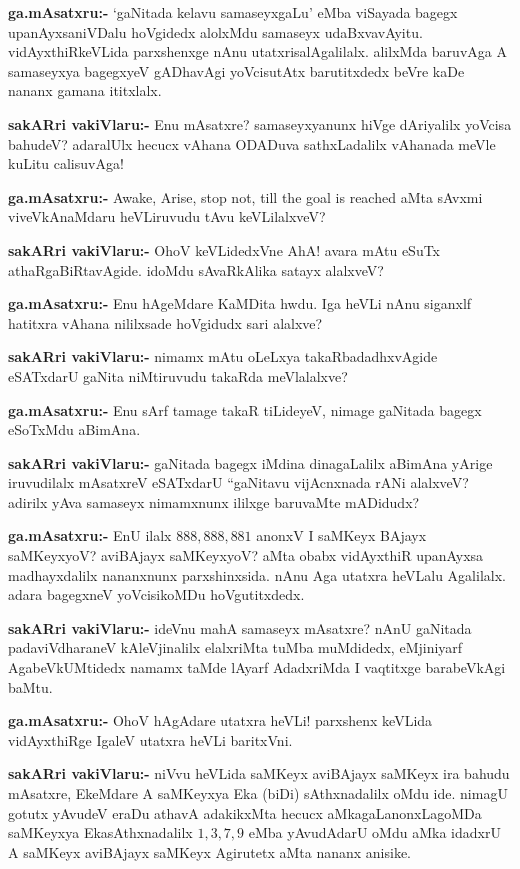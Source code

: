 \smallskip
\noindent
\textbf{ga.mAsatxru:-} `gaNitada kelavu samaseyxgaLu' eMba viSayada bagegx upanAyxsaniVDalu hoVgidedx alolxMdu samaseyx udaBxvavAyitu. vidAyxthiRkeVLida parxshenxge nAnu utatxrisalAgalilalx. alilxMda baruvAga A samaseyxya bagegxyeV gADhavAgi yoVcisutAtx barutitxdedx beVre kaDe nananx gamana ititxlalx.

\smallskip
\noindent
\textbf{sakARri vakiVlaru:-} Enu mAsatxre? samaseyxyanunx hiVge dAriyalilx yoVcisa bahudeV? adaralUlx hecucx vAhana ODADuva sathxLadalilx vAhanada meVle kuLitu calisuvAga!

\smallskip
\noindent
\textbf{ga.mAsatxru:-} {\rm Awake, Arise, stop not, till the goal is reached} aMta sAvxmi viveVkAnaMdaru heVLiruvudu tAvu keVLilalxveV?

\smallskip
\noindent
\textbf{sakARri vakiVlaru:-} OhoV keVLidedxVne AhA! avara mAtu eSuTx athaRgaBiRtavAgide. idoMdu sAvaRkAlika satayx alalxveV?

\smallskip
\noindent
\textbf{ga.mAsatxru:-} Enu hAgeMdare KaMDita hwdu. Iga heVLi nAnu siganxlf hatitxra vAhana nililxsade hoVgidudx sari alalxve?

\smallskip
\noindent
\textbf{sakARri vakiVlaru:-} nimamx mAtu oLeLxya takaRbadadhxvAgide eSATxdarU gaNita niMtiruvudu takaRda meVlalalxve?

\smallskip
\noindent
\textbf{ga.mAsatxru:-} Enu sArf tamage takaR tiLideyeV, nimage gaNitada bagegx eSoTxMdu aBimAna.

\smallskip
\noindent
\textbf{sakARri vakiVlaru:-} gaNitada bagegx iMdina dinagaLalilx aBimAna yArige iruvudilalx mAsatxreV eSATxdarU ``gaNitavu vijAcnxnada rANi alalxveV? adirilx yAva samaseyx nimamxnunx ililxge baruvaMte mADidudx?

\smallskip
\noindent
\textbf{ga.mAsatxru:-} EnU ilalx $888, 888, 881$  anonxV I saMKeyx BAjayx saMKeyxyoV? aviBAjayx saMKeyxyoV? aMta obabx vidAyxthiR upanAyxsa madhayxdalilx nananxnunx parxshinxsida. nAnu Aga utatxra heVLalu Agalilalx. adara bagegxneV yoVcisikoMDu hoVgutitxdedx.

\smallskip
\noindent
\textbf{sakARri vakiVlaru:-} ideVnu mahA samaseyx mAsatxre? nAnU gaNitada padaviVdharaneV kAleVjinalilx elalxriMta tuMba muMdidedx, eMjiniyarf AgabeVkUMtidedx namamx taMde lAyarf AdadxriMda I vaqtitxge barabeVkAgi baMtu.

\smallskip
\noindent
\textbf{ga.mAsatxru:-} OhoV hAgAdare utatxra heVLi! parxshenx keVLida vidAyxthiRge IgaleV utatxra heVLi baritxVni.

\smallskip
\noindent
\textbf{sakARri vakiVlaru:-} niVvu heVLida saMKeyx aviBAjayx saMKeyx ira bahudu mAsatxre, EkeMdare A saMKeyxya Eka (biDi) sAthxnadalilx oMdu ide. nimagU gotutx yAvudeV eraDu athavA adakikxMta hecucx aMkagaLanonxLagoMDa saMKeyxya EkasAthxnadalilx $1, 3, 7, 9$ eMba yAvudAdarU oMdu aMka idadxrU A saMKeyx aviBAjayx saMKeyx Agirutetx aMta nananx anisike.


